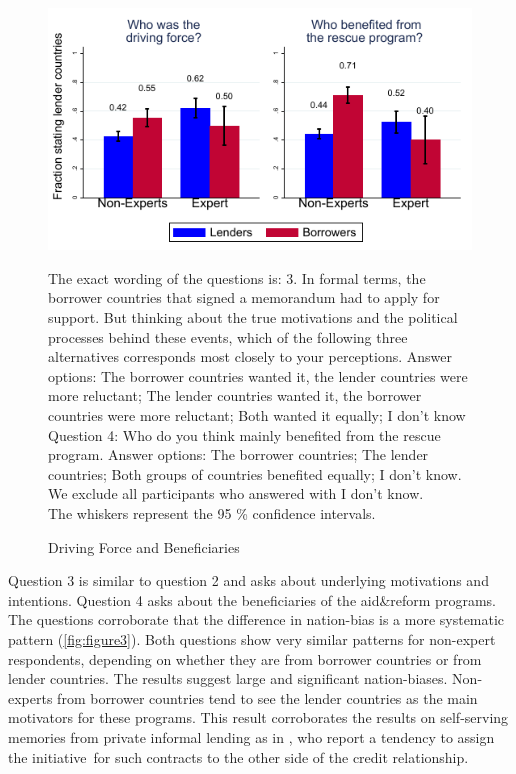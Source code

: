\begin{figure}
    \begin{center}
      \caption{Driving Force and Beneficiaries}
    \includegraphics[scale=1.2]{graph3.pdf}
  
    \label{fig:figure2}
    \end{center}
    \tiny
    \begin{tablenotes} 
    {The exact wording of the questions is: 3. In formal terms, the borrower countries that signed a memorandum had to apply for support. But thinking about the true motivations and the political processes behind these events, which of the following three alternatives corresponds most closely to your perceptions. Answer options: The borrower countries wanted it, the lender countries were more reluctant; The lender countries wanted it, the borrower countries were more reluctant; Both wanted it equally; I don't know \\
   Question 4: Who do you think mainly benefited from the rescue program. Answer options: The borrower countries; The lender countries; Both groups of countries benefited equally; I don't know. We exclude all participants who answered with I don't know. \\
   The whiskers represent the 95 \% confidence intervals.}  
    \end{tablenotes}
\end{figure}
Question 3 is similar to question 2 and asks about underlying motivations
and intentions. Question 4 asks about the beneficiaries of the aid\&reform
programs. The questions corroborate that the difference in nation-bias is a more systematic pattern (\autoref{fig:figure3}). Both questions show very similar patterns for non-expert
respondents, depending on whether they are from borrower countries or from
lender countries. The results suggest large and significant nation-biases. Non-experts
from borrower countries tend to see the lender countries as the main
motivators for these programs. This result corroborates the results on
self-serving memories from private informal lending as in \cite{dezso}, who report a tendency to assign the initiative\
for such contracts to the other side of the credit relationship. 

